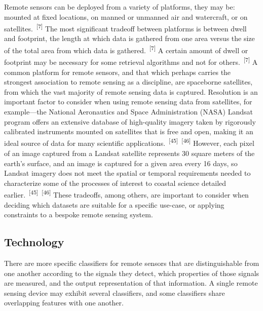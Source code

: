 \documentclass{article}
\begin{document}

\par{Remote sensors can be deployed from a variety of platforms, they may be: mounted at fixed locations, on manned or unmanned air and watercraft, or on satellites.~\textsuperscript{[7]} The most significant tradeoff between platforms is between dwell and footprint, the length at which data is gathered from one area versus the size of the total area from which data is gathered.~\textsuperscript{[7]} A certain amount of dwell or footprint may be necessary for some retrieval algorithms and not for others.~\textsuperscript{[7]} A common platform for remote sensors, and that which perhaps carries the strongest association to remote sensing as a discipline, are spaceborne satellites, from which the vast majority of remote sensing data is captured. Resolution is an important factor to consider when using remote sensing data from satellites, for example---the National Aeronautics and Space Administration (NASA) Landsat program offers an extensive database of high-quality imagery taken by rigorously calibrated instruments mounted on satellites that is free and open, making it an ideal source of data for many scientific applications.~\textsuperscript{[45]}~\textsuperscript{[46]} However, each pixel of an image captured from a Landsat satellite represents 30 square meters of the earth's surface, and an image is captured for a given area every 16 days, so Landsat imagery does not meet the spatial or temporal requirements needed to characterize some of the processes of interest to coastal science detailed earlier.~\textsuperscript{[45]}~\textsuperscript{[46]} These tradeoffs, among others, are important to consider when deciding which datasets are suitable for a specific use-case, or applying constraints to a bespoke remote sensing system.}


\subsection{Technology}


\par{There are more specific classifiers for remote sensors that are distinguishable from one another according to the signals they detect, which properties of those signals are measured, and the output representation of that information. A single remote sensing device may exhibit several classifiers, and some classifiers share overlapping features with one another.}
\end{document}
